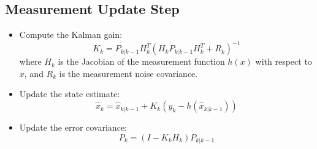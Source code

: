\documentclass[a4paper,11pt]{article}
\begin{document}
\subsection*{Measurement Update Step}
\begin{itemize}
    \item Compute the Kalman gain:
    \begin{equation}
        K_k = P_{k|k-1} H_k^T (H_k P_{k|k-1} H_k^T + R_k)^{-1}
    \end{equation}
    where $H_k$ is the Jacobian of the measurement function $h(x)$ with respect to $x$, and $R_k$ is the measurement noise covariance.
    \item Update the state estimate:
    \begin{equation}
        \hat{x}_k = \hat{x}_{k|k-1} + K_k (y_k - h(\hat{x}_{k|k-1}))
    \end{equation}
    \item Update the error covariance:
    \begin{equation}
        P_k = (I - K_k H_k) P_{k|k-1}
    \end{equation}
\end{itemize}
\end{document}
